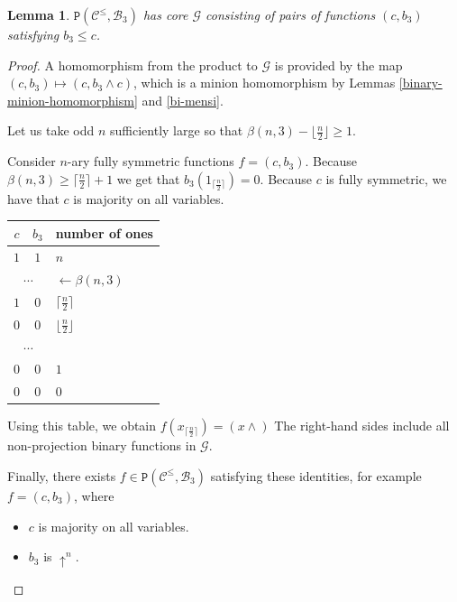 \documentclass{amsart}
\numberwithin{equation}{section}
\theoremstyle{plain}
\newtheorem{lemma}[theorem]{Lemma}
\theoremstyle{definition}
\def\clone#1{\mathcal{#1}}
\def\minion#1{\mathcal{#1}}
\def\Bc{\clone{B}}
\def\Cc{\clone{C}}
\def\atleast#1{\uparrow^{#1}}
\def\C#1{{\mathtt{P}}(#1)}
\begin{document}
\begin{lemma}\label{cleqb3} $\C{\Cc^\leq,\Bc_3}$ has core $\minion{G}$ consisting of pairs of functions $(c,b_3)$ satisfying $b_3 \leq c$.
\end{lemma}
\begin{proof}
  A homomorphism from the product to $\minion{G}$ is provided by the map $(c,b_3)\mapsto (c,b_3\wedge c)$, which is a minion homomorphism by Lemmas \ref{binary-minion-homomorphism} and \ref{bi-mensi}.

Let us take odd $n$  sufficiently large so that $\beta(n,3)-\lfloor\frac{n}{2}\rfloor\geq 1$.

Consider $n$-ary fully symmetric functions $f= (c, b_3)$.
Because $\beta(n,3) \geq \lceil\frac{n}{2}\rceil + 1$ we get that $b_3(1_{\lceil\frac{n}{2}\rceil}) = 0$. Because $c$ is fully symmetric, we have that $c$ is majority on all variables.

\begin{center}
\begin{tabular}{ |cc|l } 
 \hline
 $c$ & $b_3$ & number of ones \\ 
  \hline
     $1$ & $1$ & $n$ \\ 
     \multicolumn{2}{|c|}{$\cdots$} & \color{gray}$\longleftarrow\beta(n,3)$ \\
     $1$ & $0$ & $\lceil\frac{n}{2}\rceil$ \\
     $0$ & $0$ & $\lfloor\frac{n}{2}\rfloor$ \\
    \multicolumn{2}{|c|}{$\cdots$} \\
     $0$ & $0$ & $1$ \\ 
     $0$ & $0$ & $0$ \\ 
 \hline
\end{tabular}
\end{center}

Using this table, we obtain $f(x_{\lceil\frac{n}{2}\rceil}) = (x{\wedge})$
The right-hand sides include all non-projection binary functions in $\minion{G}$.

Finally, there exists $f\in\C{\Cc^\leq,\Bc_3}$ satisfying these identities, for example $f=(c,b_3)$, where
\begin{itemize}
\item $c$ is majority on all variables.
\item $b_3$ is $\atleast{n}$.
\end{itemize}
\end{proof}
\end{document}
